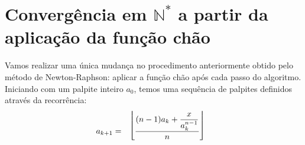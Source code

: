 \section*{Convergência em $\mathds{N}^*$
          a partir da aplicação da função chão}

Vamos realizar uma única mudança
no procedimento anteriormente obtido pelo método de Newton-Raphson:
aplicar a função chão após cada passo do algoritmo.
Iniciando com um palpite inteiro $a_0$,
temos uma sequência de palpites
definidos através da recorrência:
\[
  a_{k+1}
  = \bracketize[.75em]{\lfloor}{\rfloor}{
      \dfrac{(n-1) a_k + \dfrac{x}{a_k^{n-1}}}{n}
    }
\]



